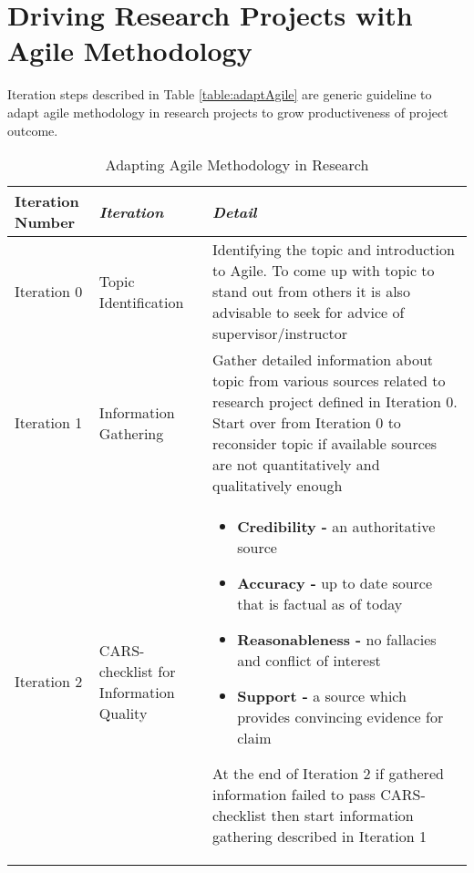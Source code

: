 \section{Driving Research Projects with Agile Methodology}\label{sec:drive-agile}
Iteration steps described in Table \ref{table:adaptAgile} are generic guideline to adapt agile methodology in research projects to grow productiveness of project outcome.
\begin{table*}[t]
	\caption{Adapting Agile Methodology in Research}
	\begin{center}
		\begin{tabular}{|p{3cm}|p{4cm}|p{8cm}|}
			\hline
			\textbf{Iteration Number} & \textbf{\textit{Iteration}} & \textbf{\textit{Detail}}\\
			\hline
			Iteration 0 & Topic Identification & Identifying the topic and introduction to Agile. To come up with topic to stand out from others it is also advisable to seek for advice of supervisor/instructor
			\\ \hline
			Iteration 1 & Information Gathering & Gather detailed information about topic from various sources related to research project defined in Iteration 0. Start over from Iteration 0 to reconsider topic if available sources are not quantitatively and qualitatively enough
			\\ \hline
			Iteration 2 & CARS-checklist\cite{cars-checklist} for Information Quality & 
				\begin{itemize}
					\item \textbf{Credibility -} an authoritative source
					\item \textbf{Accuracy -} up to date source that is factual as of today
					\item \textbf{Reasonableness -} no fallacies and conflict of interest
					\item \textbf{Support -} a source which provides convincing evidence for claim
				\end{itemize}
			At the end of Iteration 2 if gathered information failed to pass CARS-checklist then start information gathering described in Iteration 1
			\\ \hline

\end{tabular}
\end{center}
\end{table*}

